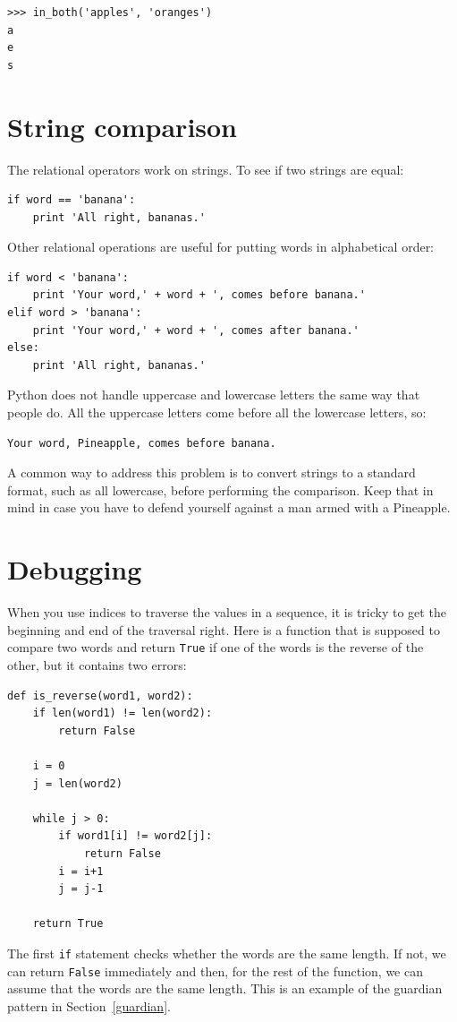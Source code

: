 \documentclass[10pt]{book}
\begin{document}
\begin{verbatim}
>>> in_both('apples', 'oranges')
a
e
s
\end{verbatim}
%

\section{String comparison}

The relational operators work on strings.  To see if two strings are equal:

\begin{verbatim}
if word == 'banana':
    print 'All right, bananas.'
\end{verbatim}
%
Other relational operations are useful for putting words in alphabetical
order:

\begin{verbatim}
if word < 'banana':
    print 'Your word,' + word + ', comes before banana.'
elif word > 'banana':
    print 'Your word,' + word + ', comes after banana.'
else:
    print 'All right, bananas.'
\end{verbatim}
%
Python does not handle uppercase and lowercase letters the same way
that people do.  All the uppercase letters come before all the
lowercase letters, so:

\begin{verbatim}
Your word, Pineapple, comes before banana.
\end{verbatim}
%
A common way to address this problem is to convert strings to a
standard format, such as all lowercase, before performing the
comparison.  Keep that in mind in case you have to defend yourself
against a man armed with a Pineapple.


\section{Debugging}

When you use indices to traverse the values in a sequence,
it is tricky to get the beginning and end of the traversal
right.  Here is a function that is supposed to compare two
words and return {\tt True} if one of the words is the reverse
of the other, but it contains two errors:

\begin{verbatim}
def is_reverse(word1, word2):
    if len(word1) != len(word2):
        return False
    
    i = 0
    j = len(word2)

    while j > 0:
        if word1[i] != word2[j]:
            return False
        i = i+1
        j = j-1

    return True
\end{verbatim}
%
The first {\tt if} statement checks whether the words are the
same length.  If not, we can return {\tt False} immediately
and then, for the rest of the function, we can assume that the words
are the same length.  This is an example of the guardian pattern
in Section~\ref{guardian}.
\end{document}
